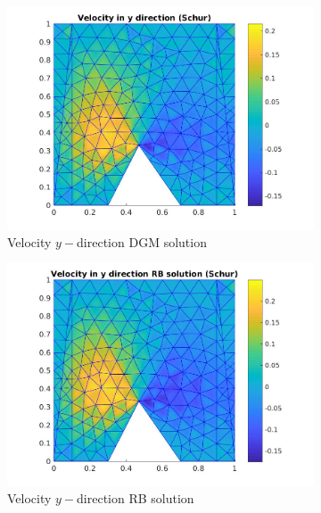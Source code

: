 \documentclass[graybox]{svmult}
\begin{document}
\begin{figure}[H]
\begin{subfigure}{0.31\textwidth}
\includegraphics[width=\linewidth]{offline_velocity_2_at_47_33.jpg}
\caption{Velocity $y-$direction DGM solution} \label{vel_y_dg}
\end{subfigure}\hspace*{\fill}
\begin{subfigure}{0.31\textwidth}
\includegraphics[width=\linewidth]{online_velocity_2_at_47_33.jpg}
\caption{Velocity $y-$direction RB solution} \label{vel_y_rb}
\end{subfigure}
\begin{subfigure}{0.31\textwidth}

\end{subfigure}
\end{figure}
\end{document}

